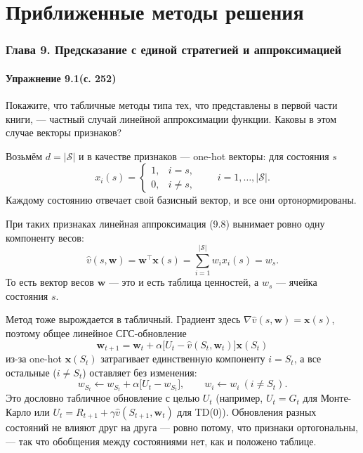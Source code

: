 \part{Приближенные методы решения}
\section{Глава 9. Предсказание с единой стратегией и аппроксимацией}

\subsection{Упражнение 9.1(с. 252)}
Покажите, что табличные методы типа тех, что представлены в первой части книги, --- частный случай линейной аппроксимации функции. Каковы в этом случае векторы признаков?
\begin{solution}
    Возьмём $d=|\mathcal S|$ и в качестве признаков --- one-hot векторы: для
    состояния $s$
    \begin{equation*}
        x_i(s) = \begin{cases} 1, & i = s,\\ 0, & i \ne s, \end{cases}
        \qquad i = 1, \dots, |\mathcal S|.
    \end{equation*}
    Каждому состоянию отвечает свой базисный вектор, и все они ортонормированы.

    При таких признаках линейная аппроксимация (9.8) вынимает ровно одну
    компоненту весов:
    \begin{equation*}
        \hat v(s, \mathbf w) = \mathbf w^\top \mathbf x(s)
        = \sum_{i=1}^{|\mathcal S|} w_i x_i(s) = w_s.
    \end{equation*}
    То есть вектор весов $\mathbf w$ --- это и есть таблица ценностей, а $w_s$ ---
    ячейка состояния $s$.

    Метод тоже вырождается в табличный. Градиент здесь $\nabla\hat v(s,\mathbf w)
    = \mathbf x(s)$, поэтому общее линейное СГС-обновление
    \begin{equation*}
        \mathbf w_{t+1} = \mathbf w_t + \alpha\big[U_t - \hat v(S_t,\mathbf w_t)\big]\mathbf x(S_t)
    \end{equation*}
    из-за one-hot $\mathbf x(S_t)$ затрагивает единственную компоненту $i=S_t$, а
    все остальные ($i\ne S_t$) оставляет без изменения:
    \begin{equation*}
        w_{S_t} \leftarrow w_{S_t} + \alpha\big[U_t - w_{S_t}\big],
        \qquad w_i \leftarrow w_i \ (i \ne S_t).
    \end{equation*}
    Это дословно табличное обновление с целью $U_t$ (например, $U_t = G_t$ для
    Монте-Карло или $U_t = R_{t+1} + \gamma\hat v(S_{t+1},\mathbf w_t)$ для TD(0)).
    Обновления разных состояний не влияют друг на друга --- ровно потому, что
    признаки ортогональны, --- так что обобщения между состояниями нет, как и
    положено таблице.
\end{solution}

